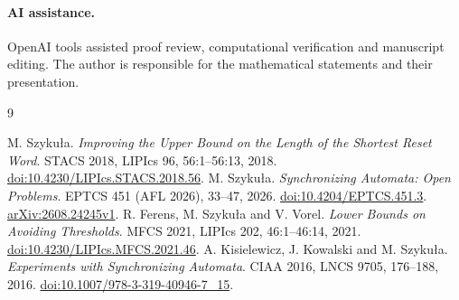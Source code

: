 \documentclass[10pt]{article}
\begin{document}
\paragraph{AI assistance.}
OpenAI tools assisted proof review, computational verification and manuscript editing. The author is responsible for the mathematical statements and their presentation.

\begin{thebibliography}{9}
\raggedright
{} M. Szyku\l a.
\emph{Improving the Upper Bound on the Length of the Shortest Reset Word}.
STACS 2018, LIPIcs 96, 56:1--56:13, 2018.
\href{https://doi.org/10.4230/LIPIcs.STACS.2018.56}{doi:10.4230/LIPIcs.STACS.2018.56}.
 M. Szyku\l a.
\emph{Synchronizing Automata: Open Problems}.
EPTCS 451 (AFL 2026), 33--47, 2026.
\href{https://doi.org/10.4204/EPTCS.451.3}{doi:10.4204/EPTCS.451.3}.
\href{https://arxiv.org/abs/2608.24245v1}{arXiv:2608.24245v1}.
 R. Ferens, M. Szyku\l a and V. Vorel.
\emph{Lower Bounds on Avoiding Thresholds}.
MFCS 2021, LIPIcs 202, 46:1--46:14, 2021.
\href{https://doi.org/10.4230/LIPIcs.MFCS.2021.46}{doi:10.4230/LIPIcs.MFCS.2021.46}.
 A. Kisielewicz, J. Kowalski and M. Szyku\l a.
\emph{Experiments with Synchronizing Automata}.
CIAA 2016, LNCS 9705, 176--188, 2016.
\href{https://doi.org/10.1007/978-3-319-40946-7_15}{doi:10.1007/978-3-319-40946-7\_15}.
\end{thebibliography}
\end{document}
